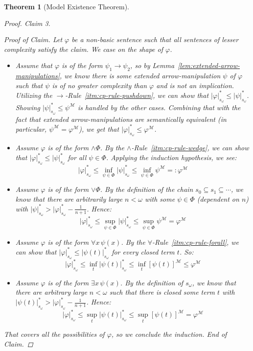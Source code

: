 \documentclass{amsart}
\newtheorem{theorem}{Theorem}[section]
\theoremstyle{definition}
\numberwithin{equation}{theorem}
\renewcommand{\phi}{\varphi}
\newcommand{\unvee}{{\vee}}
\newcommand{\unwedge}{{\wedge}}
\newcommand{\narrow}[1]{\xrightarrow{#1}}
\renewcommand{\to}{\narrow{}}
\newenvironment{claim}[1]{\vspace{.07in}\par\noindent\emph{Claim #1.}\space}{}
\newenvironment{claimproof}{\vspace{.07in}\par\noindent\emph{Proof of Claim.}\space}{\hfill \emph{End of Claim.}}
\begin{document}
\begin{theorem}[Model Existence Theorem]
\begin{proof}
\begin{claim}{3}
\begin{claimproof}
        Let $\phi$ be a non-basic sentence such that all sentences of lesser complexity satisfy the claim.
        We case on the shape of $\phi$.
        \begin{itemize}
        \item
          Assume that $\phi$ is of the form $\psi_1\to\psi_2$, so by Lemma~\ref{lem:extended-arrow-manipulations}, we know there is some extended arrow-manipulation $\psi$ of $\phi$ such that $\psi$ is of no greater complexity than $\phi$ and is not an implication.
          Utilizing the $\to$-Rule~\ref{itm:cp-rule-pushdown}, we can show that $|\phi|^*_{s_\omega}\leq|\psi|^*_{s_\omega}$.
          Showing $|\psi|^*_{s_\omega}\leq \psi^\mathcal M$ is handled by the other cases.
          Combining that with the fact that extended arrow-manipulations are semantically equivalent (in particular, $\psi^\mathcal M=\phi^\mathcal M$), we get that $|\phi|^*_{s_\omega}\leq\phi^\mathcal M$.
        \item
          Assume $\phi$ is of the form $\unwedge\Phi$. 
          By the $\unwedge$-Rule~\ref{itm:cp-rule-wedge}, we can show that $|\phi|^*_{s_\omega}\leq|\psi|^*_{s_\omega}$ for all $\psi\in\Phi$.
          Applying the induction hypothesis, we see:
          \[
            |\phi|^*_{s_\omega}\leq\inf_{\psi\in\Phi}|\psi|^*_{s_\omega}\leq\inf_{\psi\in\Phi}\psi^\mathcal M=:\phi^\mathcal M
          \]
        \item
          Assume $\phi$ is of the form $\unvee\Phi$.
          By the definition of the chain $s_0\subseteq s_1\subseteq\cdots$, we know that there are arbitrarily large $n<\omega$ with some $\psi\in\Phi$ (dependent on $n$) with $|\psi|^*_{s_\omega}>|\phi|^*_{s_\omega}-\tfrac1{n+1}$.
          Hence:
          \[
            |\phi|^*_{s_\omega}\leq\sup_{\psi\in\Phi}|\psi|^*_{s_\omega}\leq\sup_{\psi\in\Phi}\psi^\mathcal M=\phi^\mathcal M
          \]
        \item
          Assume $\phi$ is of the form $\forall x\,\psi(x)$.
          By the $\forall$-Rule~\ref{itm:cp-rule-forall}, we can show that $|\phi|^*_{s_\omega}\leq|\psi(t)|^*_{s_\omega}$ for every closed term $t$.
          So:
          \[
            |\phi|^*_{s_\omega}\leq\inf_t|\psi(t)|^*_{s_\omega}\leq\inf_t[\psi(t)]^\mathcal M\leq\phi^\mathcal M
          \]
        \item
          Assume $\phi$ is of the form $\exists x\,\psi(x)$.
          By the definition of $s_\omega$, we know that there are arbitrary large $n<\omega$ such that there is closed some term $t$ with $|\psi(t)|^*_{s_\omega}>|\phi|^*_{s_\omega}-\tfrac1{n+1}$.
          Hence:
          \[
            |\phi|^*_{s_\omega}\leq\sup_t|\psi(t)|^*_{s_\omega}\leq\sup_t[\psi(t)]^\mathcal M=\phi^\mathcal M
          \]
        \end{itemize}
        That covers all the possibilities of $\phi$, so we conclude the induction.
      \end{claimproof}
    \end{claim}
    

\end{proof}
\end{theorem}
\end{document}
